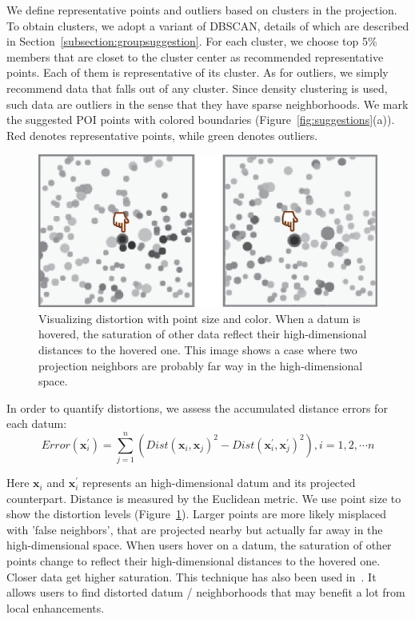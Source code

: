 We define representative points and outliers based on clusters in the projection. To obtain clusters, we adopt a variant of DBSCAN, details of which are described in Section~\ref{subsection:groupsuggestion}. For each cluster, we choose top 5\% members that are closet to the cluster center as recommended representative points. Each of them is representative of its cluster. As for outliers, we simply recommend data that falls out of any cluster. Since density clustering is used, such data are outliers in the sense that they have sparse neighborhoods. We mark the suggested POI points with colored boundaries (Figure~\ref{fig:suggestions}(a)). Red denotes representative points, while green denotes outliers.

\begin{figure}[htbp]
\centering
\includegraphics[width=0.65\linewidth]{images/suggestion_distortion.eps}
  \caption{Visualizing distortion with point size and color. When a datum is hovered, the saturation of other data reflect their high-dimensional distances to the hovered one. This image shows a case where two projection neighbors are probably far way in the high-dimensional space.}
\label{fig:enhancement_distortion}
  \end{figure}

In order to quantify distortions, we assess the accumulated distance errors for each datum:
\begin{equation}
Error(\mathbf{x}_{i}^{\prime}) = \sum\limits_{j=1}^{n}(Dist(\mathbf{x}_{i}, \mathbf{x}_{j})^{2} - Dist(\mathbf{x}_{i}^{\prime}, \mathbf{x}_{j}^{\prime})^{2}), i = 1,2,\cdots n
\end{equation}
  
Here $\mathbf{x}_{i}$ and $\mathbf{x}_{i}^{\prime}$ represents an high-dimensional datum and its projected counterpart. Distance is measured by the Euclidean metric. We use point size to show the distortion levels (Figure~\ref{fig:enhancement_distortion}). Larger points are more likely misplaced with 'false neighbors', that are projected nearby but actually far away in the high-dimensional space. When users hover on a datum, the saturation of other points change to reflect their high-dimensional distances to the hovered one. Closer data get higher saturation. This technique has also been used in~\cite{DBLP:journals/tvcg/StahnkeDMT16}. It allows users to find distorted datum / neighborhoods that may benefit a lot from local enhancements.
  
